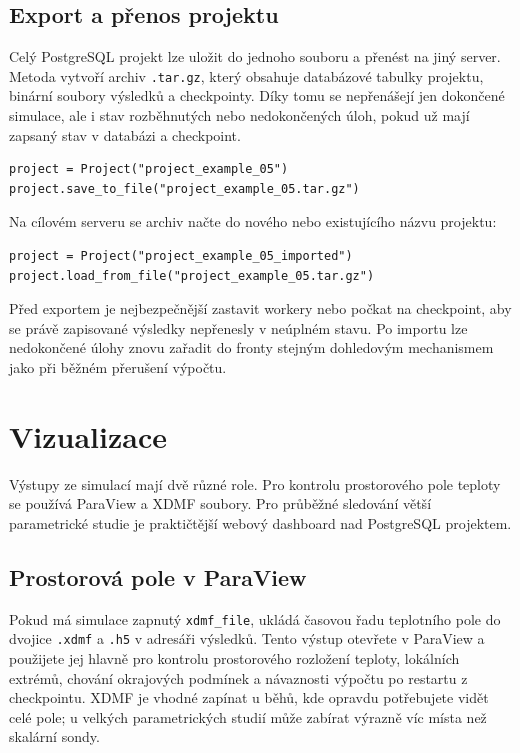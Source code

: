 \documentclass[a4paper,11pt]{article}
\begin{document}
\subsection*{Export a přenos projektu}

Celý PostgreSQL projekt lze uložit do jednoho souboru a přenést na jiný server.
Metoda  vytvoří archiv \texttt{.tar.gz}, který
obsahuje databázové tabulky projektu, binární soubory výsledků a checkpointy.
Díky tomu se nepřenášejí jen dokončené simulace, ale i stav rozběhnutých nebo
nedokončených úloh, pokud už mají zapsaný stav v databázi a checkpoint.

\begin{lstlisting}[style=py]
project = Project("project_example_05")
project.save_to_file("project_example_05.tar.gz")
\end{lstlisting}

Na cílovém serveru se archiv načte do nového nebo existujícího názvu projektu:

\begin{lstlisting}[style=py]
project = Project("project_example_05_imported")
project.load_from_file("project_example_05.tar.gz")
\end{lstlisting}

Před exportem je nejbezpečnější zastavit workery nebo počkat na checkpoint, aby
se právě zapisované výsledky nepřenesly v neúplném stavu. Po importu lze
nedokončené úlohy znovu zařadit do fronty stejným dohledovým mechanismem jako
při běžném přerušení výpočtu.



\section{Vizualizace}\label{sec:vis}

Výstupy ze simulací mají dvě různé role. Pro kontrolu prostorového pole teploty
se používá ParaView a XDMF soubory. Pro průběžné sledování větší parametrické
studie je praktičtější webový dashboard nad PostgreSQL projektem.

\subsection*{Prostorová pole v ParaView}

Pokud má simulace zapnutý \texttt{xdmf\_file}, ukládá časovou řadu teplotního
pole do dvojice \texttt{.xdmf} a \texttt{.h5} v adresáři výsledků. Tento výstup
otevřete v ParaView a použijete jej hlavně pro kontrolu prostorového rozložení
teploty, lokálních extrémů, chování okrajových podmínek a návaznosti výpočtu po
restartu z checkpointu. XDMF je vhodné zapínat u běhů, kde opravdu potřebujete
vidět celé pole; u velkých parametrických studií může zabírat výrazně víc místa
než skalární sondy.
\end{document}
